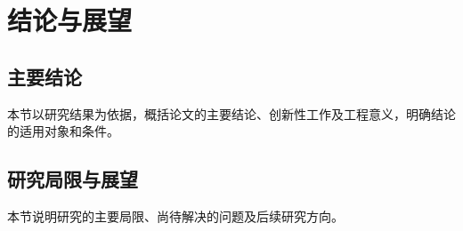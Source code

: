 \chapter{结论与展望}
\section{主要结论}
本节以研究结果为依据，概括论文的主要结论、创新性工作及工程意义，明确结论的适用对象和条件。
\section{研究局限与展望}
本节说明研究的主要局限、尚待解决的问题及后续研究方向。

